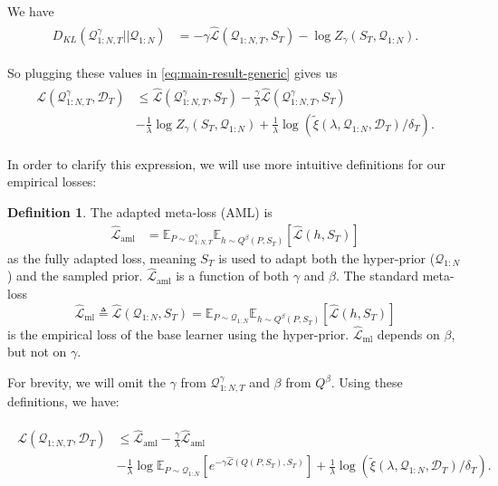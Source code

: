 \documentclass{article} %
\theoremstyle{definition}
\newtheorem{defn}{Definition}[section]
\begin{document}
We have 
\begin{align*} 
\begin{split}
D_{KL}(\mathcal{Q}^{\gamma}_{1:N,T}||\mathcal{Q}_{1:N})&=
-\gamma\hat{\mathcal{L}}(\mathcal{Q}_{1:N,T}, S_T)
-\log Z_\gamma(S_T, \mathcal{Q}_{1:N}) .
\end{split}
\end{align*}

So plugging these values in \eqref{eq:main-result-generic} gives us
\begin{align*} 
\begin{split}
\mathcal{L}(\mathcal{Q}^{\gamma}_{1:N,T}, \mathcal{D}_T) & \leq \hat{\mathcal{L}}(\mathcal{Q}^{\gamma}_{1:N,T}, S_T) -\frac{\gamma}{\lambda}\hat{\mathcal{L}}(\mathcal{Q}^{\gamma}_{1:N,T}, S_T) \\ &- \frac{1}{\lambda}\log Z_\gamma(S_T, \mathcal{Q}_{1:N}) +\frac{1}{\lambda}\log\left (\tilde{\xi}(\lambda,\mathcal{Q}_{1:N},\mathcal{D}_T)/\delta_T\right ) .
\end{split}
\end{align*}

In order to clarify this expression, we will use more intuitive definitions for our empirical losses:
\begin{defn}
	The adapted meta-loss (AML) is  
	\begin{align*} 
	\hat{\mathcal{L}}_{\mathrm{aml}} 
	&=\mathbb{E}_{P\sim \mathcal{Q}^{\gamma}_{1:N,T}}\mathbb{E}_{h\sim Q^{\beta}(P,S_T)}\left [\hat{\mathcal{L}}(h, S_T)\right ]
	\end{align*} 
	as the fully adapted loss, meaning $S_T$ is used to adapt both the hyper-prior ($\mathcal{Q}_{1:N}$) and the sampled prior. $\hat{\mathcal{L}}_{\mathrm{aml}}$ is a function of both $\gamma$ and $\beta$. The standard meta-loss 
	$$
	\hat{\mathcal{L}}_{\mathrm{ml}}\triangleq \hat{\mathcal{L}}(\mathcal{Q}_{1:N}, S_T)=\mathbb{E}_{P\sim \mathcal{Q}_{1:N}}\mathbb{E}_{h\sim Q^{\beta}(P,S_T)}\left [\hat{\mathcal{L}}(h, S_T)\right ]
	$$ 
	is the empirical loss of the base learner using the hyper-prior. 
	$\hat{\mathcal{L}}_{\mathrm{ml}}$ depends on $\beta$, but not on $\gamma$.
\end{defn}

For brevity, we will omit the $\gamma$ from $\mathcal{Q}^{\gamma}_{1:N,T}$ and $\beta$ from $Q^{\beta}$. Using these definitions, we have:

\begin{align*} 
\begin{split}
\mathcal{L}(\mathcal{Q}_{1:N,T}, \mathcal{D}_T) &\leq \hat{\mathcal{L}}_{\mathrm{aml}} -\frac{\gamma}{\lambda}\hat{\mathcal{L}}_{\mathrm{aml}} \\
&- \frac{1}{\lambda}\log \mathbb{E}_{P\sim \mathcal{Q}_{1:N}}\left [e^{-\gamma\hat{\mathcal{L}}(Q(P,S_T),S_T)}\right ]
+\frac{1}{\lambda}\log\left (\tilde{\xi}(\lambda,\mathcal{Q}_{1:N},\mathcal{D}_T)/\delta_T\right ) .
\end{split}
\end{align*}
\end{document}
